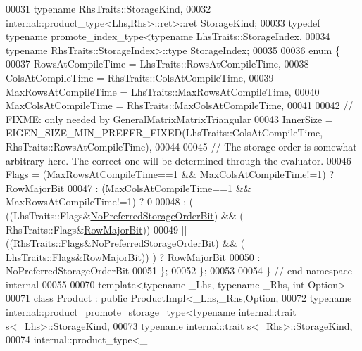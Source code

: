 \begin{DoxyCode}
00031                                                 \textcolor{keyword}{typename} RhsTraits::StorageKind,
00032                                                 internal::product\_type<Lhs,Rhs>::ret>::ret StorageKind;
00033   \textcolor{keyword}{typedef} \textcolor{keyword}{typename} promote\_index\_type<\textcolor{keyword}{typename} LhsTraits::StorageIndex,
00034                                       \textcolor{keyword}{typename} RhsTraits::StorageIndex>::type StorageIndex;
00035   
00036   \textcolor{keyword}{enum} \{
00037     RowsAtCompileTime    = LhsTraits::RowsAtCompileTime,
00038     ColsAtCompileTime    = RhsTraits::ColsAtCompileTime,
00039     MaxRowsAtCompileTime = LhsTraits::MaxRowsAtCompileTime,
00040     MaxColsAtCompileTime = RhsTraits::MaxColsAtCompileTime,
00041     
00042     \textcolor{comment}{// FIXME: only needed by GeneralMatrixMatrixTriangular}
00043     InnerSize = EIGEN\_SIZE\_MIN\_PREFER\_FIXED(LhsTraits::ColsAtCompileTime, RhsTraits::RowsAtCompileTime),
00044     
00045     \textcolor{comment}{// The storage order is somewhat arbitrary here. The correct one will be determined through the
       evaluator.}
00046     Flags = (MaxRowsAtCompileTime==1 && MaxColsAtCompileTime!=1) ? \hyperlink{group__flags_gae4f56c2a60bbe4bd2e44c5b19cbe8762}{RowMajorBit}
00047           : (MaxColsAtCompileTime==1 && MaxRowsAtCompileTime!=1) ? 0
00048           : (   ((LhsTraits::Flags&\hyperlink{group__flags_ga3c186ad80ddcf5e2ed3d7ee31cca1860}{NoPreferredStorageOrderBit}) && (
      RhsTraits::Flags&\hyperlink{group__flags_gae4f56c2a60bbe4bd2e44c5b19cbe8762}{RowMajorBit}))
00049              || ((RhsTraits::Flags&\hyperlink{group__flags_ga3c186ad80ddcf5e2ed3d7ee31cca1860}{NoPreferredStorageOrderBit}) && (
      LhsTraits::Flags&\hyperlink{group__flags_gae4f56c2a60bbe4bd2e44c5b19cbe8762}{RowMajorBit})) ) ? RowMajorBit
00050           : NoPreferredStorageOrderBit
00051   \};
00052 \};
00053 
00054 \} \textcolor{comment}{// end namespace internal}
00055 
00070 \textcolor{keyword}{template}<\textcolor{keyword}{typename} \_Lhs, \textcolor{keyword}{typename} \_Rhs, \textcolor{keywordtype}{int} Option>
00071 \textcolor{keyword}{class }Product : \textcolor{keyword}{public} ProductImpl<\_Lhs,\_Rhs,Option,
00072                                    typename internal::product\_promote\_storage\_type<typename internal::trait
      s<\_Lhs>::StorageKind,
00073                                                                                    typename internal::trait
      s<\_Rhs>::StorageKind,
00074                                                                                    internal::product\_type<\_

\end{DoxyCode}
